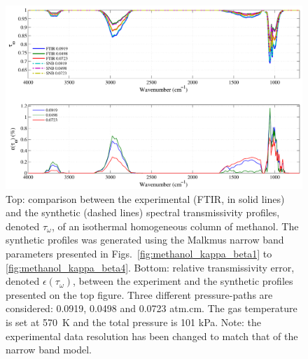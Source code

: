 \begin{figure}[p]
\includegraphics[width=\textwidth]{Figures/Comparison_Fit_Methanol_MALKMUS_Temp570K.pdf}
\caption{Top: comparison between the experimental (FTIR, in solid lines) and the synthetic (dashed lines) spectral transmissivity profiles, denoted $\tau_{\omega}$, of an isothermal homogeneous column of methanol. The synthetic profiles was generated using the Malkmus narrow band parameters presented in Figs.~\ref{fig:methanol_kappa_beta1} to \ref{fig:methanol_kappa_beta4}. Bottom: relative transmissivity error, denoted $\epsilon{(\tau_{\omega})}$, between the experiment and the synthetic profiles presented on the top figure. Three different pressure-paths are considered: 0.0919, 0.0498 and 0.0723 atm.cm. The gas temperature is set at 570~K and the total pressure is 101 kPa. Note: the experimental data resolution has been changed to match that of the narrow band model. \label{fig:methanol_SNBVerify_570K}}
\end{figure}

